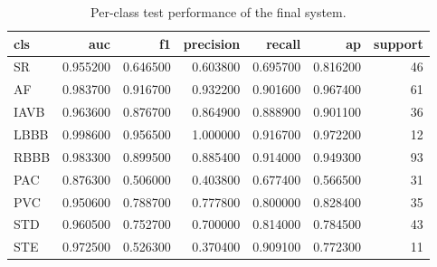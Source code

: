 \begin{table}[htbp]\centering\caption{Per-class test performance of the final system.}\label{tab:perclass}
\begin{tabular}{lrrrrrr}
\toprule
cls & auc & f1 & precision & recall & ap & support \\
\midrule
SR & 0.955200 & 0.646500 & 0.603800 & 0.695700 & 0.816200 & 46 \\
AF & 0.983700 & 0.916700 & 0.932200 & 0.901600 & 0.967400 & 61 \\
IAVB & 0.963600 & 0.876700 & 0.864900 & 0.888900 & 0.901100 & 36 \\
LBBB & 0.998600 & 0.956500 & 1.000000 & 0.916700 & 0.972200 & 12 \\
RBBB & 0.983300 & 0.899500 & 0.885400 & 0.914000 & 0.949300 & 93 \\
PAC & 0.876300 & 0.506000 & 0.403800 & 0.677400 & 0.566500 & 31 \\
PVC & 0.950600 & 0.788700 & 0.777800 & 0.800000 & 0.828400 & 35 \\
STD & 0.960500 & 0.752700 & 0.700000 & 0.814000 & 0.784500 & 43 \\
STE & 0.972500 & 0.526300 & 0.370400 & 0.909100 & 0.772300 & 11 \\
\bottomrule
\end{tabular}
\end{table}
